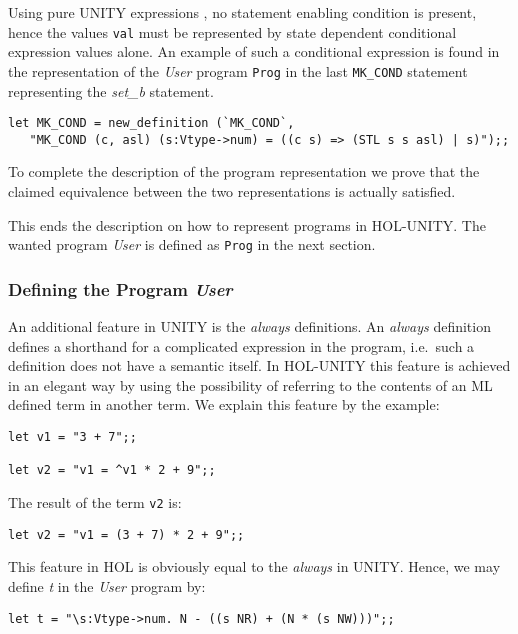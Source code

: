Using pure UNITY expressions \cite{CM88}, no statement enabling condition is 
present, hence the values {\tt val} must be represented by state dependent 
conditional expression values alone.  An example of such a conditional 
expression is found in the representation of the {\it User} program {\tt Prog}
in the last {\tt MK\_COND} statement representing the {\it set\_b} statement.

{\footnotesize 
\begin{verbatim}
let MK_COND = new_definition (`MK_COND`,
   "MK_COND (c, asl) (s:Vtype->num) = ((c s) => (STL s s asl) | s)");;
\end{verbatim}
}

To complete the description of the program representation we prove that
the claimed equivalence between the two representations is actually satisfied.


This ends the description on how to represent programs in HOL-UNITY. The
wanted program {\it User} is defined as {\tt Prog} in the next section.


\subsubsection{Defining the Program {\it User}}

An additional feature in UNITY is the {\it always} definitions. An
{\it always} definition defines a shorthand for a complicated expression
in the program, i.e.\ such a definition does not have a semantic itself. In
HOL-UNITY this feature is achieved in an elegant way by using the possibility
of referring to the contents of an ML defined term in another term.  We
explain this feature by the example:

{\footnotesize 
\begin{verbatim}
let v1 = "3 + 7";;

let v2 = "v1 = ^v1 * 2 + 9";;
\end{verbatim}
}

The result of the term {\tt v2} is:

{\footnotesize 
\begin{verbatim}
let v2 = "v1 = (3 + 7) * 2 + 9";;
\end{verbatim}
}

This feature in HOL is obviously equal to the {\it always} in UNITY.  Hence,
we may define {\it t} in the {\it User} program by:

{\footnotesize 
\begin{verbatim}
let t = "\s:Vtype->num. N - ((s NR) + (N * (s NW)))";;
\end{verbatim}
}

